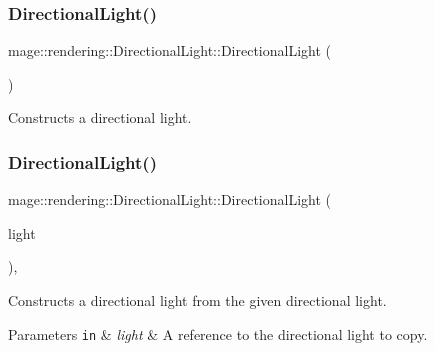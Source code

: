 \subsubsection{\texorpdfstring{Directional\+Light()}{DirectionalLight()}\hspace{0.1cm}{\footnotesize\ttfamily [1/3]}}
{\footnotesize\ttfamily mage\+::rendering\+::\+Directional\+Light\+::\+Directional\+Light (\begin{DoxyParamCaption}{ }\end{DoxyParamCaption})\hspace{0.3cm}{\ttfamily [noexcept]}}

Constructs a directional light. \hypertarget{classmage_1_1rendering_1_1_directional_light_a95bac0f10225523a7aaf7d17503f6a5f}{}\label{classmage_1_1rendering_1_1_directional_light_a95bac0f10225523a7aaf7d17503f6a5f} 
\subsubsection{\texorpdfstring{Directional\+Light()}{DirectionalLight()}\hspace{0.1cm}{\footnotesize\ttfamily [2/3]}}
{\footnotesize\ttfamily mage\+::rendering\+::\+Directional\+Light\+::\+Directional\+Light (\begin{DoxyParamCaption}\item[{const \hyperlink{classmage_1_1rendering_1_1_directional_light}{Directional\+Light} \&}]{light }\end{DoxyParamCaption})\hspace{0.3cm}{\ttfamily [default]}, {\ttfamily [noexcept]}}

Constructs a directional light from the given directional light.


\begin{DoxyParams}[1]{Parameters}
\mbox{\tt in}  & {\em light} & A reference to the directional light to copy. \\
\hline
\end{DoxyParams}
\hypertarget{classmage_1_1rendering_1_1_directional_light_aa8ff1e6487160eb851cc2c393be9ab6a}{}\label{classmage_1_1rendering_1_1_directional_light_aa8ff1e6487160eb851cc2c393be9ab6a} 
